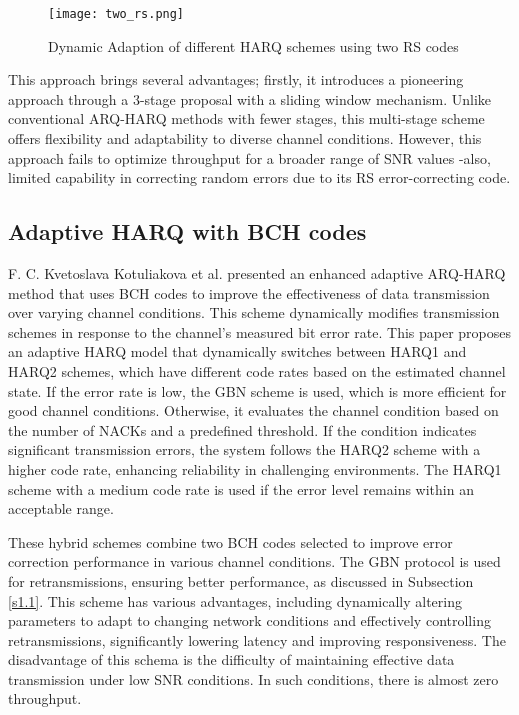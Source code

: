 \documentclass[sn-mathphys-num]{sn-jnl}
\theoremstyle{thmstyleone}
\theoremstyle{thmstyletwo}%
\theoremstyle{thmstylethree}%
\begin{document}
   
\begin{figure}[H]
    \centering
    \texttt{[image: two\_rs.png]}
    \caption{Dynamic Adaption of different HARQ schemes using two RS codes}
    \label{fig:3}
\end{figure}

This approach brings several advantages; firstly, it introduces a pioneering approach through a 3-stage proposal with a sliding window mechanism. Unlike conventional ARQ-HARQ methods with fewer stages, this multi-stage scheme offers flexibility and adaptability to diverse channel conditions. However, this approach fails to optimize throughput for a broader range of SNR values -also, limited capability in correcting random errors due to its RS error-correcting code.

\subsection{Adaptive HARQ with BCH codes } \label{s2.3}

F. C. Kvetoslava Kotuliakova et al. \cite{r5} presented an enhanced adaptive ARQ-HARQ method that uses BCH codes to improve the effectiveness of data transmission over varying channel conditions. This scheme dynamically modifies transmission schemes in response to the channel's measured bit error rate. This paper proposes an adaptive HARQ model that dynamically switches between HARQ1 and HARQ2 schemes, which have different code rates based on the estimated channel state. If the error rate is low, the GBN scheme is used, which is more efficient for good channel conditions. Otherwise, it evaluates the channel condition based on the number of NACKs and a predefined threshold. If the condition indicates significant transmission errors, the system follows the HARQ2 scheme with a higher code rate, enhancing reliability in challenging environments. The HARQ1 scheme with a medium code rate is used if the error level remains within an acceptable range.


These hybrid schemes combine two BCH codes selected to improve error correction performance in various channel conditions. The GBN \cite{r18} protocol is used for retransmissions, ensuring better performance, as discussed in Subsection \ref{s1.1}. This scheme has various advantages, including dynamically altering parameters to adapt to changing network conditions and effectively controlling retransmissions, significantly lowering latency and improving responsiveness. The disadvantage of this schema is the difficulty of maintaining effective data transmission under low SNR conditions. In such conditions, there is almost zero throughput.
\end{document}
